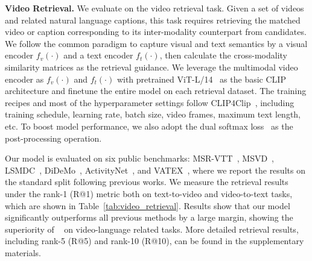 \textbf{Video Retrieval.}
We evaluate \model on the video retrieval task. Given a set of videos and related natural language captions, this task requires retrieving the matched video or caption corresponding to its inter-modality counterpart from candidates. We follow the common paradigm to capture visual and text semantics by a visual encoder $f_v(\cdot)$ and a text encoder $f_t(\cdot)$, then calculate the cross-modality similarity matrices as the retrieval guidance. We leverage the multimodal video encoder as $f_v(\cdot)$ and $f_t(\cdot)$ with pretrained ViT-L/14~\cite{dosovitskiy2020image} as the basic CLIP~\cite{CLIP} architecture and finetune the entire model on each retrieval dataset. The training recipes and most of the hyperparameter settings follow CLIP4Clip~\cite{clip4clip}, including training schedule, learning rate, batch size, video frames, maximum text length, etc. To boost model performance, we also adopt the dual softmax loss~\cite{cheng2021improving} as the post-processing operation.

Our model is evaluated on six public benchmarks: MSR-VTT~\cite{xu2016msr}, MSVD~\cite{wu2017deep}, LSMDC~\cite{anne2017localizing}, DiDeMo~\cite{rohrbach2015dataset}, ActivityNet~\cite{caba2015activitynet}, and VATEX~\cite{wang2019vatex}, where we report the results on the standard split following previous works. We measure the retrieval results under the rank-1 (R@1) metric both on text-to-video and video-to-text tasks, which are shown in Table~\ref{tab:video_retrieval}. Results show that our model significantly outperforms all previous methods by a large margin, showing the superiority of \model~ on video-language related tasks. More detailed retrieval results, including rank-5 (R@5) and rank-10 (R@10), can be found in the supplementary materials.
